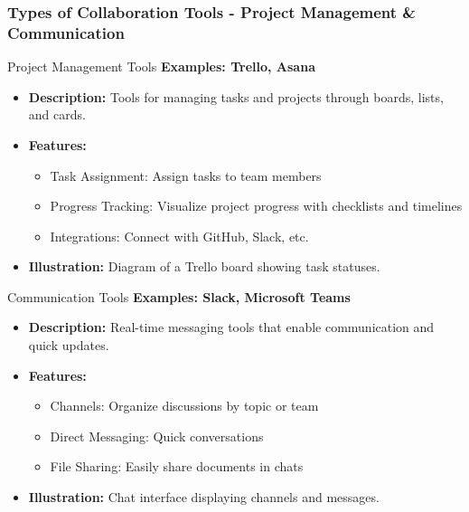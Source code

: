\documentclass[aspectratio=169]{beamer}
\begin{document}
\begin{frame}[fragile]
    \frametitle{Types of Collaboration Tools - Project Management & Communication}
    \begin{block}{Project Management Tools}
        \textbf{Examples: Trello, Asana}
        
        \begin{itemize}
            \item \textbf{Description:} Tools for managing tasks and projects through boards, lists, and cards.
            \item \textbf{Features:}
                \begin{itemize}
                    \item Task Assignment: Assign tasks to team members
                    \item Progress Tracking: Visualize project progress with checklists and timelines
                    \item Integrations: Connect with GitHub, Slack, etc.
                \end{itemize}
            \item \textbf{Illustration:} Diagram of a Trello board showing task statuses.
        \end{itemize}
    \end{block}
    
    \begin{block}{Communication Tools}
        \textbf{Examples: Slack, Microsoft Teams}
        
        \begin{itemize}
            \item \textbf{Description:} Real-time messaging tools that enable communication and quick updates.
            \item \textbf{Features:}
                \begin{itemize}
                    \item Channels: Organize discussions by topic or team
                    \item Direct Messaging: Quick conversations
                    \item File Sharing: Easily share documents in chats
                \end{itemize}
            \item \textbf{Illustration:} Chat interface displaying channels and messages.
        \end{itemize}
    \end{block}
\end{frame}
\end{document}

